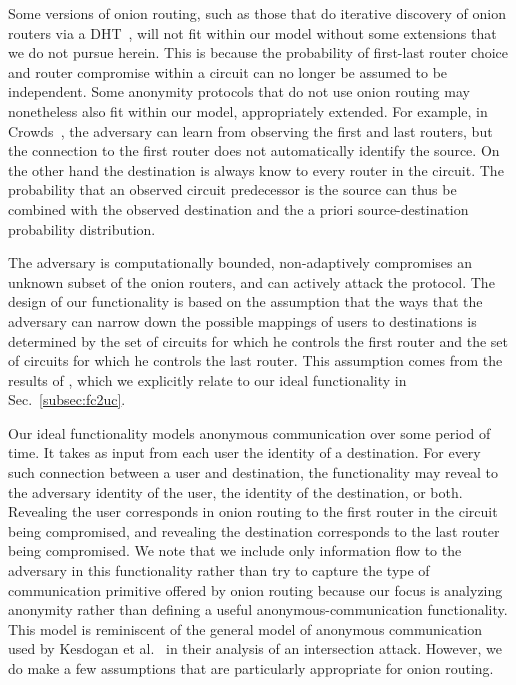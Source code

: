 \documentclass[prodmode,acmtissec]{acmsmall}
\begin{document}
Some versions of onion routing, such as those that do iterative
discovery of onion routers via a
DHT~\cite{tarzan:ccs02,ccs09-shadowwalker,ccs09-torsk}, will not fit
within our model without some extensions that we do not pursue herein.
This is because the probability of first-last router choice and router
compromise within a circuit can no longer be assumed to be
independent. Some anonymity protocols that do not use onion routing
may nonetheless also fit within our model, appropriately extended.
For example, in Crowds~\cite{crowds:tissec}, the adversary can learn
from observing the first and last routers, but the connection to the
first router does not automatically identify the source. On the other
hand the destination is always know to every router in the
circuit. The probability that an observed circuit predecessor is the
source can thus be combined with the observed destination and the a
priori source-destination probability distribution.

The adversary is computationally bounded, non-adaptively compromises
an unknown subset of the onion routers, and can actively attack the
protocol. The design of our functionality is based on the assumption that the
ways that the adversary can narrow down the possible mappings of users
to destinations is determined by the set of circuits for which he
controls the first router and the set of circuits for which he
controls the last router. This assumption comes from the results of ,
which we explicitly relate to our ideal functionality in Sec.~\ref{subsec:fc2uc}.



Our ideal functionality models anonymous communication over some period of time. It takes as input from each user the identity of a destination. For every such connection between a user and destination, the functionality may reveal to the adversary identity of the user, the identity of the destination, or both. Revealing the user corresponds in onion routing to the first router in the circuit being compromised, and revealing the destination corresponds to the last router being compromised. We note that we include only information flow to the adversary in this functionality rather than try to capture the type of communication primitive offered by onion routing because our focus is analyzing anonymity rather than defining a useful anonymous-communication functionality. This model is reminiscent of the general model of anonymous communication used by Kesdogan et al.~ in their analysis of an intersection attack. However, we do make a few assumptions that are particularly appropriate for onion routing.
\end{document}
